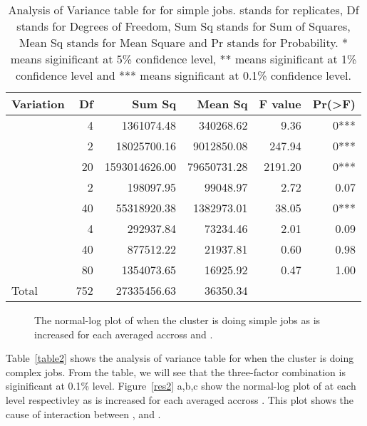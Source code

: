 \documentclass[preprint]{acm_proc_article-sp}
\begin{document}
\begin{table*}
	\caption{Analysis of Variance table for  for simple jobs.  stands for replicates, Df stands for Degrees of Freedom, Sum Sq stands for Sum of Squares, Mean Sq stands for Mean Square and Pr stands for Probability. * means siginificant at 5\% confidence level, ** means siginificant at 1\% confidence level and *** means significant at 0.1\% confidence level.}
	\label{table1}
	\centering
	\begin{tabular}{l|rrrrr}
		\hline\hline
		Variation&Df&Sum Sq&Mean Sq&F value&Pr(>F)\\
		\hline
		&4&1361074.48&340268.62&9.36&0***\\
		&2&18025700.16&9012850.08&247.94&0***\\
		&20&1593014626.00&79650731.28&2191.20&0***\\
		&2&198097.95&99048.97&2.72&0.07\\
		&40&55318920.38&1382973.01&38.05&0***\\
		&4&292937.84&73234.46&2.01&0.09\\
		&40&877512.22&21937.81&0.60&0.98\\
		&80&1354073.65&16925.92&0.47&1.00\\
		\hline
		Total&752&27335456.63&36350.34\\
		\hline\hline
	\end{tabular}
\end{table*}

\begin{figure*}[htb]
        \centering
{}
        \caption{The normal-log plot of  when the cluster is doing simple jobs as  is increased for each  averaged accross  and .}
        \label{res1}
\end{figure*}


Table~\ref{table2} shows the analysis of variance table for  when the cluster is doing complex jobs. From the table, we will see that the three-factor combination  is siginificant at 0.1\% level. Figure~\ref{res2} a,b,c show the normal-log plot of  at each  level respectivley as  is increased for each  averaged accross . This plot shows the cause of interaction between ,  and .
\end{document}
